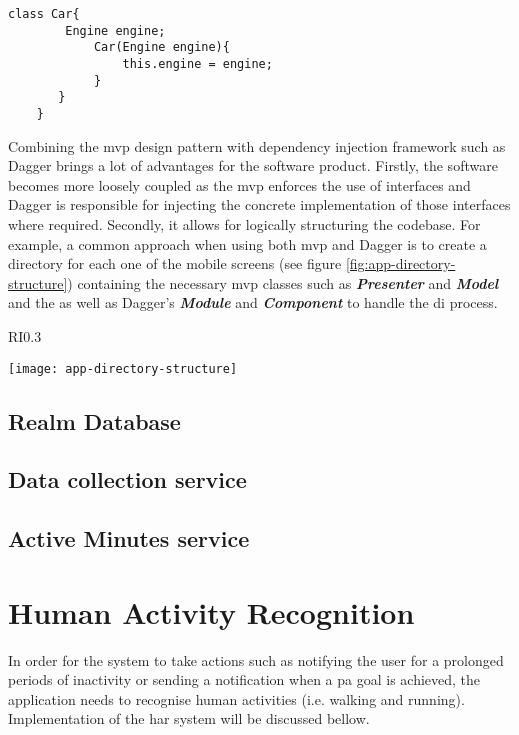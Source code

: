     
\begin{lstlisting}[caption= DI example, label=di-car-example,frame=tlrbr,basicstyle=\small,captionpos=b]
    class Car{
        Engine engine;
            Car(Engine engine){
                this.engine = engine;
            }
       }
    }
\end{lstlisting}
        
    Combining the \gls{mvp} design pattern with dependency injection framework such as Dagger brings a lot of advantages for the software product. Firstly, the software becomes more loosely coupled as the \gls{mvp} enforces the use of interfaces and Dagger is responsible for injecting the concrete implementation of those interfaces where required. Secondly, it allows for logically structuring the codebase. For example, a common approach when using both \gls{mvp} and Dagger is to create a directory for each one of the mobile screens (see figure \ref{fig:app-directory-structure}) containing the necessary \gls{mvp} classes such as \textit{\textbf{Presenter}} and \textit{\textbf{Model}} and the as well as Dagger's \textit{\textbf{Module}} and \textit{\textbf{Component}} to handle the \gls{di} process.
    
    \begin{wrapfigure}{RI}{0.3\textwidth}
        \begin{center}
            \texttt{[image: app-directory-structure]}
        \end{center}
    \caption{Data collection screen directory structure}
    \label{fig:app-directory-structure}
    \end{wrapfigure}
   
    
    \subsection{Realm Database}
    
    \subsection{Data collection service}
    
    \subsection{Active Minutes service}
    


\section{Human Activity Recognition}
In order for the system to take actions such as notifying the user for a prolonged periods of inactivity or sending a notification when a \gls{pa} goal is achieved, the application needs to recognise human activities (i.e. walking and running). Implementation of the \gls{har} system will be discussed bellow.

